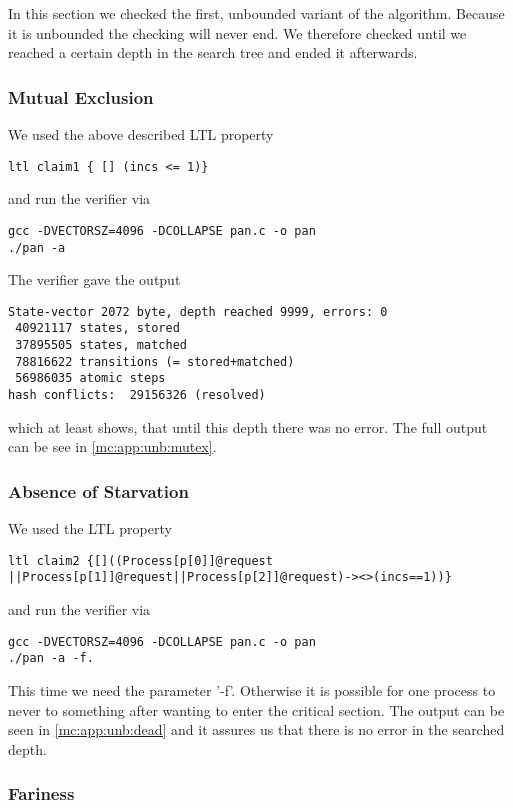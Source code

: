 \documentclass{llncs}
\begin{document}
In this section we checked the first, unbounded variant of the algorithm.
Because it is unbounded the checking will never end. We therefore checked until we reached
a certain depth in the search tree and ended it afterwards.

\subsubsection{Mutual Exclusion}

We used the above described LTL property
\begin{lstlisting}
ltl claim1 { [] (incs <= 1)}
\end{lstlisting}
and run the verifier via
\begin{lstlisting}
gcc -DVECTORSZ=4096 -DCOLLAPSE pan.c -o pan
./pan -a
\end{lstlisting}

The verifier gave the output
\begin{lstlisting}
State-vector 2072 byte, depth reached 9999, errors: 0
 40921117 states, stored
 37895505 states, matched
 78816622 transitions (= stored+matched)
 56986035 atomic steps
hash conflicts:  29156326 (resolved)
\end{lstlisting}
which at least shows, that until this depth there was no error.
The full output can be see in \ref{mc:app:unb:mutex}.

\subsubsection{Absence of Starvation}

We used the LTL property
\begin{lstlisting}
ltl claim2 {[]((Process[p[0]]@request
||Process[p[1]]@request||Process[p[2]]@request)-><>(incs==1))}
\end{lstlisting}
and run the verifier via
\begin{lstlisting}
gcc -DVECTORSZ=4096 -DCOLLAPSE pan.c -o pan
./pan -a -f.
\end{lstlisting}
This time we need the parameter '-f'. Otherwise it is possible for one process to never to something after wanting to enter
the critical section. The output can be seen in \ref{mc:app:unb:dead} and it assures us that there is no error in
the searched depth.

\subsubsection{Fariness}
\end{document}
